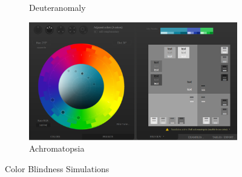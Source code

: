 \begin{figure}[bh]
\begin{subfigure}[b]{0.4\linewidth}
        \caption{Deuteranomaly}
    \end{subfigure}
    \begin{subfigure}[b]{0.4\linewidth}
        \includegraphics[width=\linewidth]{figures/color-scheme-achromatopsia.png}
        \caption{Achromatopsia}
    \end{subfigure}
\caption{Color Blindness Simulations}
\label{fig:color-scheme-simulations}
\end{figure}